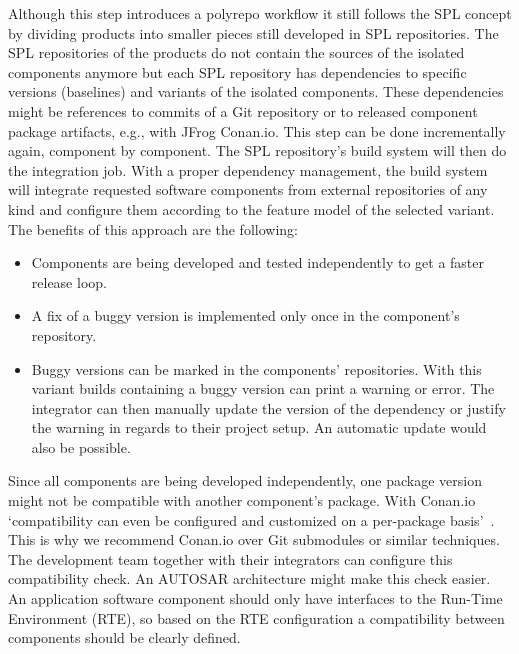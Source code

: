 Although this step introduces a polyrepo workflow it still follows the SPL
concept by dividing products into smaller pieces still developed in SPL
repositories. The SPL repositories of the products do not contain the sources of
the isolated components anymore but each SPL repository has dependencies to
specific versions (baselines) and variants of the isolated components. These
dependencies might be references to commits of a Git repository or to released
component package artifacts, e.g., with JFrog Conan.io. This step can be done
incrementally again, component by component. The SPL repository's build system
will then do the integration job. With a proper dependency management, the build
system will integrate requested software components from external repositories
of any kind and configure them according to the feature model of the selected
variant. The benefits of this approach are the following:
\begin{itemize}
  \item Components are being developed and tested independently to get a faster
        release loop.
  \item A fix of a buggy version is implemented only once in the component's
        repository.
  \item Buggy versions can be marked in the components' repositories. With this
        variant builds containing a buggy version can print a warning or error.
        The integrator can then manually update the version of the dependency or
        justify the warning in regards to their project setup. An automatic
        update would also be possible.
\end{itemize}
Since all components are being developed independently, one package version
might not be compatible with another component's package. With Conan.io
`compatibility can even be configured and customized on a per-package
basis'~\cite{conandocs}. This is why we recommend Conan.io over Git submodules
or similar techniques. The development team together with their integrators can
configure this compatibility check. An AUTOSAR architecture might make this
check easier. An application software component should only have interfaces to
the Run-Time Environment (RTE), so based on the RTE configuration a
compatibility between components should be clearly defined.

